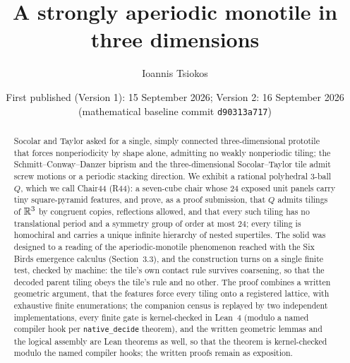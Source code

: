 \documentclass[11pt,reqno]{amsart}
\begin{document}
\title[A strongly aperiodic monotile in three dimensions]{A strongly aperiodic monotile in three dimensions}

\author{Ioannis Tsiokos}
\address{}

\date{First published (Version 1): 15 September 2026; Version 2: 16 September 2026
  (mathematical baseline commit \texttt{d90313a717})}

\begin{abstract}
Socolar and Taylor asked for a single, simply connected three-dimensional prototile that forces
nonperiodicity by shape alone, admitting no weakly nonperiodic tiling; the Schmitt--Conway--Danzer
biprism and the three-dimensional Socolar--Taylor tile admit screw motions or a periodic stacking
direction. We exhibit a rational polyhedral $3$-ball $Q$, which we call Chair44 (R44): a
seven-cube chair whose $24$ exposed unit
panels carry tiny square-pyramid features, and prove, as a proof submission, that $Q$ admits tilings
of $\mathbb{R}^3$ by congruent copies, reflections allowed, and that every such tiling has no translational
period and a symmetry group of order at most $24$; every tiling is homochiral and carries a unique
infinite hierarchy of nested supertiles. The solid was designed to a reading of the
aperiodic-monotile phenomenon reached with the Six Birds emergence calculus (Section~3.3), and
the construction turns on a single finite test, checked by machine: the tile's own contact rule
survives coarsening, so that the decoded parent tiling obeys the tile's rule and no other. The
proof combines a written geometric argument, that the features force
every tiling onto a registered lattice, with exhaustive finite enumerations; the companion census is
replayed by two independent implementations, every finite gate is kernel-checked in Lean~4 (modulo a
named compiler hook per \texttt{native\_decide} theorem), and the written geometric lemmas and the
logical assembly are Lean theorems as well, so that the theorem is kernel-checked modulo the named
compiler hooks; the written proofs remain as exposition.
\end{abstract}
\end{document}
